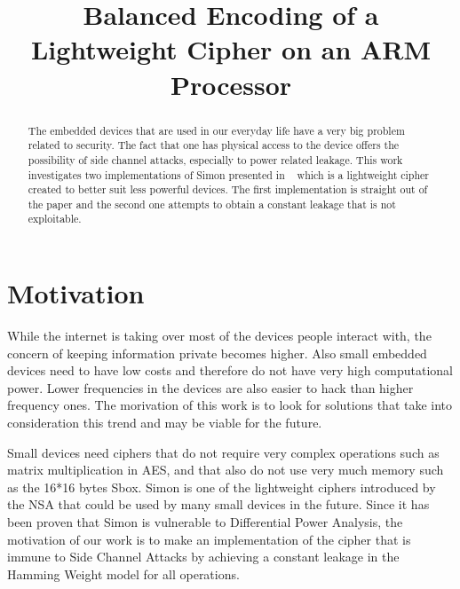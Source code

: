 \documentclass[conference]{IEEEtran}
\begin{document}
\title{Balanced Encoding of a Lightweight Cipher on an ARM Processor}


\author{
}
\maketitle

\begin{abstract}

  The embedded devices that are used in our everyday life have a very big problem related to security. The fact that one has physical access to the device offers the possibility of side channel attacks, especially to power related leakage. This work investigates two implementations of Simon presented in ~\cite{Beaulieu_Simon} which is a lightweight cipher created to better suit less powerful devices. The first implementation is straight out of the paper and the second one attempts to obtain a constant leakage that is not exploitable.

\end{abstract}

\section{Motivation}

While the internet is taking over most of the devices people interact with, the concern of keeping information private becomes higher. Also small embedded devices need to have low costs and therefore do not have very high computational power. Lower frequencies in the devices are also easier to hack than higher frequency ones. The morivation of this work is to look for solutions that take into consideration this trend and may be viable for the future.

Small devices need ciphers that do not require very complex operations such as matrix multiplication in AES, and that also do not use very much memory such as the 16*16 bytes Sbox. Simon is one of the lightweight ciphers introduced by the NSA that could be used by many small devices in the future. Since it has been proven that Simon is vulnerable to Differential Power Analysis, the motivation of our work is to make an implementation of the cipher that is immune to Side Channel Attacks by achieving a constant leakage in the Hamming Weight model for all operations.
\end{document}
